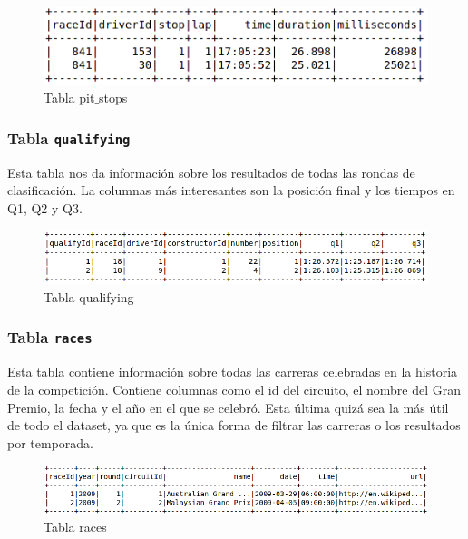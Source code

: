 \documentclass[12pt,twoside,titlepage]{report}
\begin{document}
\begin{figure}[H]
  \includegraphics[scale=0.5]{pit_stop_table.png}
  \centering
  \caption{Tabla pit$\_$stops}
  \label{fig:pitstops}
  \centering
\end{figure}

\subsubsection{Tabla \texttt{qualifying}}

Esta tabla nos da información sobre los resultados de todas las rondas de clasificación. La columnas más interesantes son la posición final y los tiempos en Q1, Q2 y Q3. 

\begin{figure}[H]
  \includegraphics[scale=0.4]{qualifying_table.png}
  \centering
  \caption{Tabla qualifying}
  \label{fig:quali}
  \centering
\end{figure}


\subsubsection{Tabla \texttt{races}}

Esta tabla contiene información sobre todas las carreras celebradas en la historia de la competición. Contiene columnas como el id del circuito, el nombre del Gran Premio, la fecha y el año en el que se celebró. Esta última quizá sea la más útil de todo el dataset, ya que es la única forma de filtrar las carreras o los resultados por temporada. 

\begin{figure}[H]
  \includegraphics[scale=0.4]{races_table.png}
  \centering
  \caption{Tabla races}
  \label{fig:races}
  \centering
\end{figure}
\end{document}
